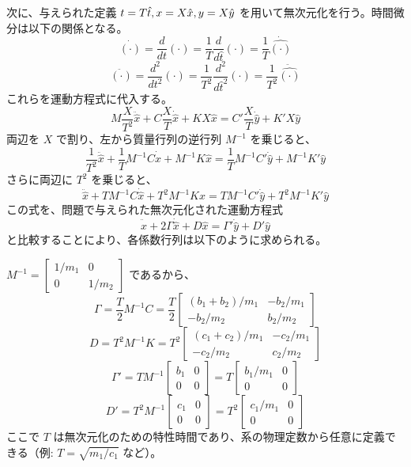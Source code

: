 \documentclass[dvipdfmx,a4paper]{jsarticle}
\begin{document}
次に、与えられた定義 $t=T\hat t , \space x=X\hat x, \space y=X\hat y$ を用いて無次元化を行う。時間微分は以下の関係となる。
$$ \dot{(\cdot)} = \frac{d}{dt}(\cdot) = \frac{1}{T}\frac{d}{d\hat{t}}(\cdot) = \frac{1}{T}\dot{\hat{(\cdot)}} $$
$$ \ddot{(\cdot)} = \frac{d^2}{dt^2}(\cdot) = \frac{1}{T^2}\frac{d^2}{d\hat{t}^2}(\cdot) = \frac{1}{T^2}\ddot{\hat{(\cdot)}} $$
これらを運動方程式に代入する。
$$ M \frac{X}{T^2} \ddot{\hat{x}} + C \frac{X}{T} \dot{\hat{x}} + K X \hat{x} = C' \frac{X}{T} \dot{\hat{y}} + K' X \hat{y} $$
両辺を $X$ で割り、左から質量行列の逆行列 $M^{-1}$ を乗じると、
$$ \frac{1}{T^2} \ddot{\hat{x}} + \frac{1}{T} M^{-1} C \dot{\hat{x}} + M^{-1} K \hat{x} = \frac{1}{T} M^{-1} C' \dot{\hat{y}} + M^{-1} K' \hat{y} $$
さらに両辺に $T^2$ を乗じると、
$$ \ddot{\hat{x}} + T M^{-1} C \dot{\hat{x}} + T^2 M^{-1} K \hat{x} = T M^{-1} C' \dot{\hat{y}} + T^2 M^{-1} K' \hat{y} $$
この式を、問題で与えられた無次元化された運動方程式
$$ \ddot{\hat x}+2\Gamma\dot{\hat x}+D\hat x=\Gamma\prime\dot{\hat y}+D\prime\hat y $$
と比較することにより、各係数行列は以下のように求められる。

$M^{-1} = \begin{bmatrix} 1/m_1 & 0 \\ 0 & 1/m_2 \end{bmatrix}$ であるから、
\begin{equation}
    \Gamma = \frac{T}{2} M^{-1}C = \frac{T}{2} \begin{bmatrix} (b_1+b_2)/m_1 & -b_2/m_1 \\ -b_2/m_2 & b_2/m_2 \end{bmatrix}
\end{equation}
\begin{equation}
    D = T^2 M^{-1}K = T^2 \begin{bmatrix} (c_1+c_2)/m_1 & -c_2/m_1 \\ -c_2/m_2 & c_2/m_2 \end{bmatrix}
\end{equation}
\begin{equation}
    \Gamma' = T M^{-1} \begin{bmatrix} b_1 & 0 \\ 0 & 0 \end{bmatrix} = T \begin{bmatrix} b_1/m_1 & 0 \\ 0 & 0 \end{bmatrix}
\end{equation}
\begin{equation}
    D' = T^2 M^{-1} \begin{bmatrix} c_1 & 0 \\ 0 & 0 \end{bmatrix} = T^2 \begin{bmatrix} c_1/m_1 & 0 \\ 0 & 0 \end{bmatrix}
\end{equation}
ここで $T$ は無次元化のための特性時間であり、系の物理定数から任意に定義できる（例: $T = \sqrt{m_1/c_1}$ など）。
\end{document}
